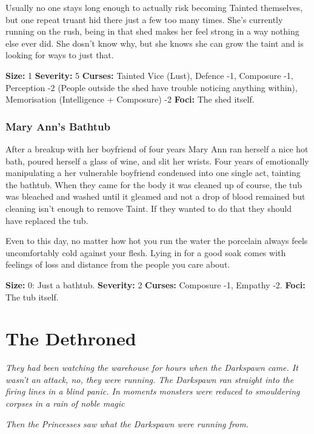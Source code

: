 Usually no one stays long enough to actually risk becoming Tainted themselves, but one repeat truant hid there just a few too many times. She's currently running on the rush, being in that shed makes her feel strong in a way nothing else ever did. She dosn't know why, but she knows she can grow the taint and is looking for ways to just that. 

\noindent \textbf{Size:} 1
\noindent \textbf{Severity:} 5
\noindent \textbf{Curses:} Tainted Vice (Lust), Defence -1, Composure -1, Perception -2 (People outside the shed have trouble noticing anything within), Memorisation (Intelligence + Composure) -2
\noindent \textbf{Foci:} The shed itself.

\subsubsection*{Mary Ann's Bathtub}

After a breakup with her boyfriend of four years Mary Ann ran herself a nice hot bath, poured herself a glass of wine, and slit her wrists. Four years of emotionally manipulating a her vulnerable boyfriend condensed into one single act, tainting the bathtub. When they came for the body it was cleaned up of course, the tub was bleached and washed until it gleamed and not a drop of blood remained but cleaning isn't enough to remove Taint. If they wanted to do that they should have replaced the tub.

Even to this day, no matter how hot you run the water the porcelain always feels uncomfortably cold against your flesh. Lying in for a good soak comes with feelings of loss and distance from the people you care about.

\noindent \textbf{Size:} 0: Just a bathtub.
\noindent \textbf{Severity:} 2
\noindent \textbf{Curses:} Composure -1, Empathy -2.
\noindent \textbf{Foci:} The tub itself.






\section*{The Dethroned}

\textit{They had been watching the warehouse for hours when the Darkspawn came. It wasn't an attack, no, they were running. The Darkspawn ran straight into the firing lines in a blind panic. In moments monsters were reduced to smouldering corpses in a rain of noble magic}

\textit{Then the Princesses saw what the Darkspawn were running from.}

